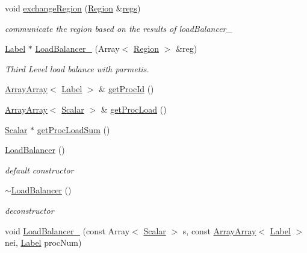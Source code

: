 \begin{DoxyCompactItemize}
void \hyperlink{classHSF_1_1LoadBalancer_aff34a6877828f65b92b9e146eaaced3b}{exchangeRegion} (\hyperlink{classHSF_1_1Region}{Region} \&\hyperlink{src_2interfaces_2interface_8hpp_aeb8610dbeef683c2abea70a1362a2d25}{regs})
\begin{DoxyCompactList}\small\item\em communicate the region based on the results of loadBalancer\_ \item\end{DoxyCompactList}\item 
\hyperlink{namespaceHSF_ae65d72be782e989396ebe5ec6ae4c2b6}{Label} $\ast$ \hyperlink{classHSF_1_1LoadBalancer_a9c6357abc32209101f62d07846cf8cff}{LoadBalancer\_} (Array$<$ \hyperlink{classHSF_1_1Region}{Region} $>$ \&reg)
\begin{DoxyCompactList}\small\item\em Third Level load balance with parmetis. \item\end{DoxyCompactList}\item 
\hyperlink{classHSF_1_1ArrayArray}{ArrayArray}$<$ \hyperlink{namespaceHSF_ae65d72be782e989396ebe5ec6ae4c2b6}{Label} $>$ \& \hyperlink{classHSF_1_1LoadBalancer_a934f19588ae53f8f2133ddb0af955e15}{getProcId} ()
\item 
\hyperlink{classHSF_1_1ArrayArray}{ArrayArray}$<$ \hyperlink{namespaceHSF_a7419497552ed1c5631a818b75eed1aec}{Scalar} $>$ \& \hyperlink{classHSF_1_1LoadBalancer_a969ba490fb82cdb116643d670b8c66b2}{getProcLoad} ()
\item 
\hyperlink{namespaceHSF_a7419497552ed1c5631a818b75eed1aec}{Scalar} $\ast$ \hyperlink{classHSF_1_1LoadBalancer_ad25ef85b3641df45c4f62a5dccf15454}{getProcLoadSum} ()
\item 
\hyperlink{classHSF_1_1LoadBalancer_af9fd71150f3cd1b8c4f87023b916dedc}{LoadBalancer} ()
\begin{DoxyCompactList}\small\item\em default constructor \item\end{DoxyCompactList}\item 
\hyperlink{classHSF_1_1LoadBalancer_aa03846f31ea99f255b23adf0777cf373}{$\sim$LoadBalancer} ()
\begin{DoxyCompactList}\small\item\em deconstructor \item\end{DoxyCompactList}\item 
void \hyperlink{classHSF_1_1LoadBalancer_a06147f535aa0c290b332c9578d80d3fa}{LoadBalancer\_} (const Array$<$ \hyperlink{namespaceHSF_a7419497552ed1c5631a818b75eed1aec}{Scalar} $>$ s, const \hyperlink{classHSF_1_1ArrayArray}{ArrayArray}$<$ \hyperlink{namespaceHSF_ae65d72be782e989396ebe5ec6ae4c2b6}{Label} $>$ nei, \hyperlink{namespaceHSF_ae65d72be782e989396ebe5ec6ae4c2b6}{Label} procNum)

\end{DoxyCompactItemize}

